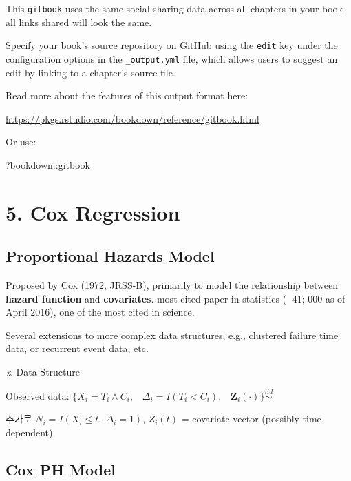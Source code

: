 \documentclass[
]{book}
\newenvironment{Shaded}{\begin{snugshade}}{\end{snugshade}}
\newcommand{\NormalTok}[1]{#1}
\newcommand{\SpecialCharTok}[1]{\textcolor[rgb]{0.00,0.00,0.00}{#1}}
\theoremstyle{definition}
\theoremstyle{definition}
\theoremstyle{definition}
\theoremstyle{definition}
\theoremstyle{remark}
\begin{document}
This \texttt{gitbook} uses the same social sharing data across all chapters in your book- all links shared will look the same.

Specify your book's source repository on GitHub using the \texttt{edit} key under the configuration options in the \texttt{\_output.yml} file, which allows users to suggest an edit by linking to a chapter's source file.

Read more about the features of this output format here:

\url{https://pkgs.rstudio.com/bookdown/reference/gitbook.html}

Or use:

\begin{Shaded}
\begin{Highlighting}[]
\NormalTok{?bookdown}\SpecialCharTok{::}\NormalTok{gitbook}
\end{Highlighting}
\end{Shaded}

\hypertarget{cox-regression}{%
\chapter{5. Cox Regression}\label{cox-regression}}

\hypertarget{proportional-hazards-model}{%
\section{Proportional Hazards Model}\label{proportional-hazards-model}}

Proposed by Cox (1972, JRSS-B), primarily to model the relationship between \textbf{hazard function} and \textbf{covariates}. most cited paper in statistics ( 41; 000 as of April 2016), one of the most cited in science.

Several extensions to more complex data structures, e.g., clustered failure time data, or recurrent event data, etc.

※ Data Structure

Observed data: \(\Big \{ X_i = T_i \wedge C_i, \; \; \; \Delta_i = I(T_i < C_i), \; \;\; \mathbf Z_i (\cdot) \Big \} \overset {iid} \sim\)

추가로 \(N_i = I(X_i \le t , \; \Delta_i = 1)\), \(Z_i(t)\) = covariate vector (possibly time-dependent).

\hypertarget{cox-ph-model}{%
\section{Cox PH Model}\label{cox-ph-model}}
\end{document}
